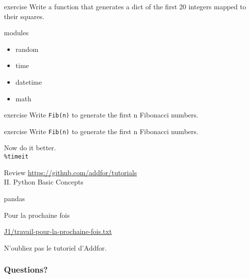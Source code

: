 \begin{frame}{exercise}
  Write a function that generates a dict of the first 20 integers
  mapped to their squares.
\end{frame}

\begin{frame}{modules}
  \begin{itemize}
  \item random
  \item time
  \item datetime
  \item math
  \end{itemize}
\end{frame}

\begin{frame}{exercise}
  Write \texttt{Fib(n)} to generate the first n Fibonacci numbers.
\end{frame}

\begin{frame}{exercise}
  Write \texttt{Fib(n)} to generate the first n Fibonacci numbers.

  Now do it better.\\
  \texttt{\%timeit}
\end{frame}

\begin{frame}{Review}
  \url{https://github.com/addfor/tutorials}\\[2mm]

  \vspace{1mm}
  \hspace{5mm} II. Python Basic Concepts
\end{frame}

\begin{frame}{pandas}
\end{frame}

\begin{frame}{Pour la prochaine fois}

  \centerline{\url{J1/travail-pour-la-prochaine-fois.txt}}

  \bigskip
  \centerline{N'oubliez pas le tutoriel d'Addfor.}
\end{frame}


\begin{frame}
  \frametitle{Questions?}
\end{frame}


